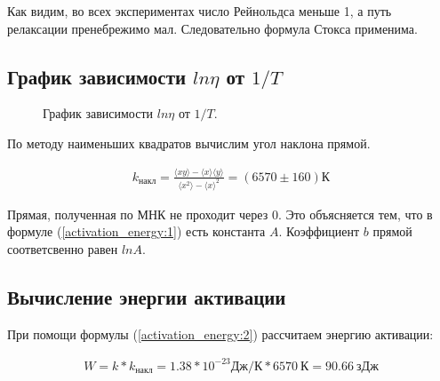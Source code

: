 \documentclass[a4paper, 12pt]{article}
\begin{document}
    Как видим, во всех экспериментах число Рейнольдса меньше 1, а путь релаксации пренебрежимо мал. Следовательно формула Стокса применима.

    \subsection{График зависимости $ln \eta$ от $1/T$}

    \begin{figure}[ht]
        \caption{График зависимости $ln \eta$ от $1/T$.}
        \label{graph}
    \end{figure}

    По методу наименьших квадратов вычислим угол наклона прямой.

    \begin{align*}
        k_{накл} = \frac{\langle xy \rangle - \langle x \rangle \langle y \rangle}{\langle x^2 \rangle - \langle x \rangle^2} = (6570 \pm 160) К
    \end{align*}

    Прямая, полученная по МНК не проходит через 0. Это объясняется тем, что в формуле (\ref{activation_energy:1}) есть константа $A$. Коэффициент $b$ прямой соответсвенно равен $lnA$.

    \subsection{Вычисление энергии активации}

    При помощи формулы (\ref{activation_energy:2}) рассчитаем энергию активации:

    \begin{align*}
        W = k * k_{накл} = 1.38 * 10^{-23} Дж/К * 6570~К = 90.66~зДж
    \end{align*}
\end{document}
